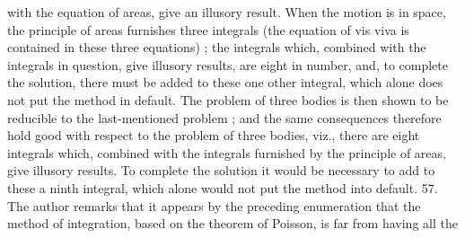\documentclass[11pt,a4paper]{book}
\begin{document}
with the equation of areas, give an illusory result. When the motion is in space, the
principle of areas furnishes three integrals (the equation of vis viva is contained in
these three equations) ; the integrals which, combined with the integrals in question,
give illusory results, are eight in number, and, to complete the solution, there must
be added to these one other integral, which alone does not put the method in default.
The problem of three bodies is then shown to be reducible to the last-mentioned
problem ; and the same consequences therefore hold good with respect to the problem
of three bodies, viz., there are eight integrals which, combined with the integrals
furnished by the principle of areas, give illusory results. To complete the solution it
would be necessary to add to these a ninth integral, which alone would not put the
method into default.
57. The author remarks that it appears by the preceding enumeration that the
method of integration, based on the theorem of Poisson, is far from having all the


\end{document}
